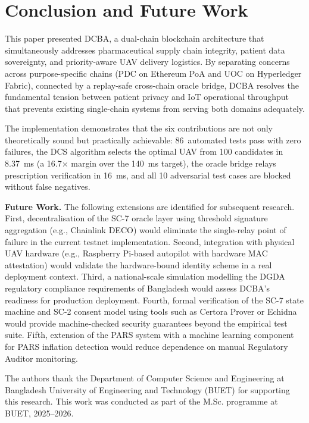 \documentclass[sigplan,screen,review=false]{acmart}
\begin{document}
\section{Conclusion and Future Work}
\label{sec:conclusion}

This paper presented DCBA, a dual-chain blockchain architecture that
simultaneously addresses pharmaceutical supply chain integrity, patient
data sovereignty, and priority-aware UAV delivery logistics. By
separating concerns across purpose-specific chains (PDC on Ethereum PoA
and UOC on Hyperledger Fabric), connected by a replay-safe cross-chain
oracle bridge, DCBA resolves the fundamental tension between patient
privacy and IoT operational throughput that prevents existing
single-chain systems from serving both domains adequately.

The implementation demonstrates that the six contributions are not
only theoretically sound but practically achievable: 86~automated
tests pass with zero failures, the DCS algorithm selects the optimal
UAV from 100 candidates in 8.37~ms (a 16.7$\times$ margin over the
140~ms target), the oracle bridge relays prescription verification in
16~ms, and all 10 adversarial test cases are blocked without false
negatives.

\textbf{Future Work.} The following extensions are identified for
subsequent research. First, decentralisation of the SC-7 oracle layer
using threshold signature aggregation (e.g., Chainlink DECO) would
eliminate the single-relay point of failure in the current testnet
implementation. Second, integration with physical UAV hardware (e.g.,
Raspberry Pi-based autopilot with hardware MAC attestation) would
validate the hardware-bound identity scheme in a real deployment
context. Third, a national-scale simulation modelling the DGDA
regulatory compliance requirements of Bangladesh would assess DCBA's
readiness for production deployment. Fourth, formal verification of
the SC-7 state machine and SC-2 consent model using tools such as
Certora Prover or Echidna would provide machine-checked security
guarantees beyond the empirical test suite. Fifth, extension of the
PARS system with a machine learning component for PARS inflation
detection would reduce dependence on manual Regulatory Auditor
monitoring.

\begin{acks}
The authors thank the Department of Computer Science and Engineering
at Bangladesh University of Engineering and Technology (BUET) for
supporting this research. This work was conducted as part of the M.Sc.
programme at BUET, 2025--2026.
\end{acks}



\end{document}
